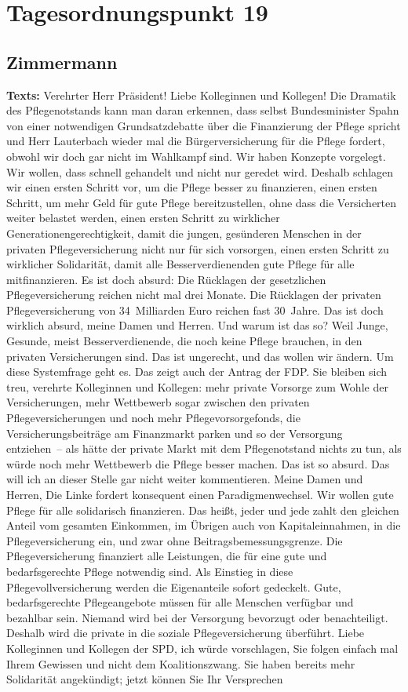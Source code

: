 \documentclass{article}
\begin{document}
\section{Tagesordnungspunkt 19}
\subsection{Zimmermann}
\noindent\textbf{Texts:} Verehrter Herr Präsident! Liebe Kolleginnen und Kollegen! Die Dramatik des Pflegenotstands kann man daran erkennen, dass selbst Bundesminister Spahn von einer notwendigen Grundsatzdebatte über die Finanzierung der Pflege spricht und Herr Lauterbach wieder mal die Bürgerversicherung für die Pflege fordert, obwohl wir doch gar nicht im Wahlkampf sind.  Wir haben Konzepte vorgelegt. Wir wollen, dass schnell gehandelt und nicht nur geredet wird.  Deshalb schlagen wir einen ersten Schritt vor, um die Pflege besser zu finanzieren, einen ersten Schritt, um mehr Geld für gute Pflege bereitzustellen, ohne dass die Versicherten weiter belastet werden,  einen ersten Schritt zu wirklicher Generationengerechtigkeit, damit die jungen, gesünderen Menschen in der privaten Pflegeversicherung nicht nur für sich vorsorgen, einen ersten Schritt zu wirklicher Solidarität, damit alle Besserverdienenden gute Pflege für alle mitfinanzieren.  Es ist doch absurd: Die Rücklagen der gesetzlichen Pflegeversicherung reichen nicht mal drei Monate. Die Rücklagen der privaten Pflegeversicherung von 34 Milliarden Euro reichen fast 30 Jahre. Das ist doch wirklich absurd, meine Damen und Herren.  Und warum ist das so? Weil Junge, Gesunde, meist Besserverdienende, die noch keine Pflege brauchen, in den privaten Versicherungen sind. Das ist ungerecht, und das wollen wir ändern.  Um diese Systemfrage geht es. Das zeigt auch der Antrag der FDP. Sie bleiben sich treu, verehrte Kolleginnen und Kollegen: mehr private Vorsorge zum Wohle der Versicherungen, mehr Wettbewerb sogar zwischen den privaten Pflegeversicherungen  und noch mehr Pflegevorsorgefonds, die Versicherungsbeiträge am Finanzmarkt parken und so der Versorgung entziehen – als hätte der private Markt mit dem Pflegenotstand nichts zu tun, als würde noch mehr Wettbewerb die Pflege besser machen. Das ist so absurd. Das will ich an dieser Stelle gar nicht weiter kommentieren.  Meine Damen und Herren, Die Linke fordert konsequent einen Paradigmenwechsel. Wir wollen gute Pflege für alle solidarisch finanzieren. Das heißt, jeder und jede zahlt den gleichen Anteil vom gesamten Einkommen, im Übrigen auch von Kapitaleinnahmen, in die Pflegeversicherung ein, und zwar ohne Beitragsbemessungsgrenze. Die Pflegeversicherung finanziert alle Leistungen, die für eine gute und bedarfsgerechte Pflege notwendig sind. Als Einstieg in diese Pflegevollversicherung werden die Eigenanteile sofort gedeckelt.  Gute, bedarfsgerechte Pflegeangebote müssen für alle Menschen verfügbar und bezahlbar sein. Niemand wird bei der Versorgung bevorzugt oder benachteiligt. Deshalb wird die private in die soziale Pflegeversicherung überführt. Liebe Kolleginnen und Kollegen der SPD, ich würde vorschlagen, Sie folgen einfach mal Ihrem Gewissen und nicht dem Koalitionszwang. Sie haben bereits mehr Solidarität angekündigt; jetzt können Sie Ihr Versprechen 
\end{document}

